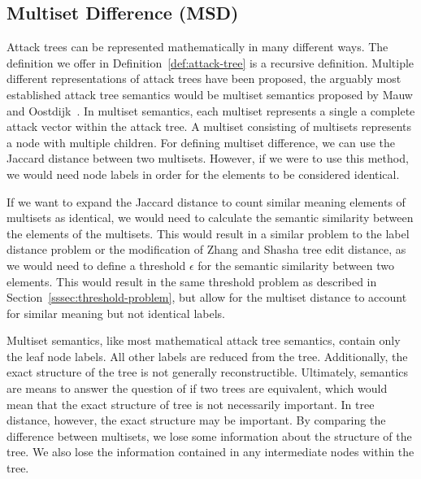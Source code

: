 \subsection{Multiset Difference (MSD)}
\label{ssec:msd}

Attack trees can be represented mathematically in many different ways. The definition we offer in Definition~\ref{def:attack-tree} is a recursive definition. Multiple different representations of attack trees have been proposed, the arguably most established attack tree semantics would be multiset semantics proposed by Mauw and Oostdijk~\cite{mauw_foundations_2006}. In multiset semantics, each multiset represents a single a complete attack vector within the attack tree. A multiset consisting of multisets represents a node with multiple children. For defining multiset difference, we can use the Jaccard distance between two multisets. However, if we were to use this method, we would need node labels in order for the elements to be considered identical.

If we want to expand the Jaccard distance to count similar meaning elements of multisets as identical, we would need to calculate the semantic similarity between the elements of the multisets. This would result in a similar problem to the label distance problem or the modification of Zhang and Shasha tree edit distance, as we would need to define a threshold $\epsilon$ for the semantic similarity between two elements. This would result in the same threshold problem as described in Section~\ref{sssec:threshold-problem}, but allow for the multiset distance to account for similar meaning but not identical labels.

Multiset semantics, like most mathematical attack tree semantics, contain only the leaf node labels. All other labels are reduced from the tree. Additionally, the exact structure of the tree is not generally reconstructible. Ultimately, semantics are means to answer the question of if two trees are equivalent, which would mean that the exact structure of tree is not necessarily important. In tree distance, however, the exact structure may be important. By comparing the difference between multisets, we lose some information about the structure of the tree. We also lose the information contained in any intermediate nodes within the tree.

